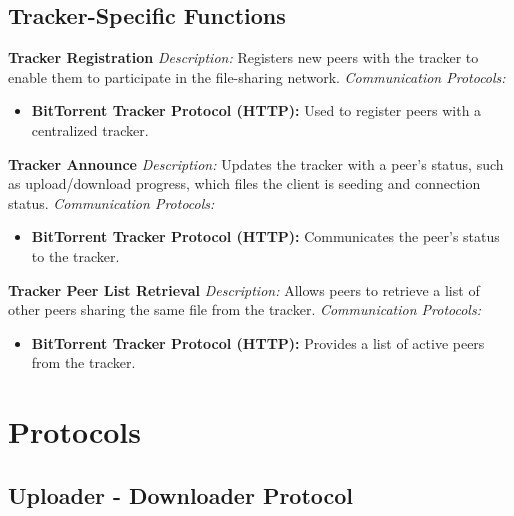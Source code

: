 \documentclass[a4paper]{article}
\begin{document}
\subsection{Tracker-Specific Functions}

    \textbf{Tracker Registration}  
    \textit{Description:} Registers new peers with the tracker to enable them to participate in the file-sharing network.  
    \textit{Communication Protocols:}
    \begin{itemize}
        \item \textbf{BitTorrent Tracker Protocol (HTTP):} Used to register peers with a centralized tracker.
    \end{itemize}

    \textbf{Tracker Announce}  
    \textit{Description:} Updates the tracker with a peer’s status, such as upload/download progress, which files the client is seeding and connection status.  
    \textit{Communication Protocols:}
    \begin{itemize}
        \item \textbf{BitTorrent Tracker Protocol (HTTP):} Communicates the peer’s status to the tracker.
    \end{itemize}

    \textbf{Tracker Peer List Retrieval}  
    \textit{Description:} Allows peers to retrieve a list of other peers sharing the same file from the tracker.  
    \textit{Communication Protocols:}
    \begin{itemize}
        \item \textbf{BitTorrent Tracker Protocol (HTTP):} Provides a list of active peers from the tracker.
    \end{itemize}

\section{Protocols}

    \subsection{Uploader - Downloader Protocol}
\end{document}
